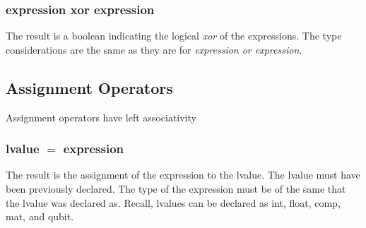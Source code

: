 \subsubsection{expression xor expression}
The result is a boolean indicating the logical \textit{xor} of the expressions. The type considerations are the same as they are for \textit{expression or expression}.
\subsection{Assignment Operators}
Assignment operators have left associativity
\subsubsection{lvalue $=$ expression}
The result is the assignment of the expression to the lvalue. The lvalue must have been previously declared. The type of the expression must be of the same that the lvalue was declared as. Recall, lvalues can be declared as int, float, comp, mat, and qubit.